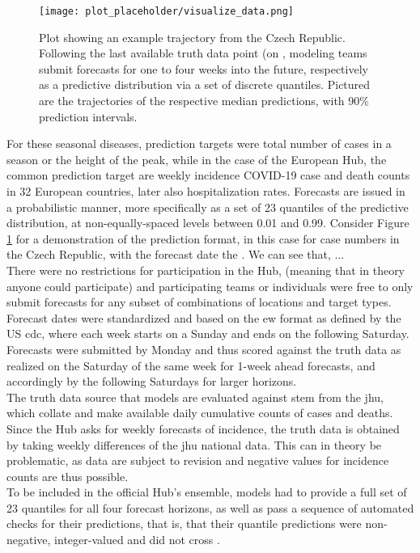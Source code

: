 \begin{figure}
\texttt{[image: plot\_placeholder/visualize\_data.png]}
\caption{ Plot showing an example trajectory from the Czech Republic. Following the last available truth data point (on , modeling teams submit forecasts for one to four weeks into the future, respectively as a predictive distribution via a set of discrete quantiles. Pictured are the trajectories of the respective median predictions, with 90\% prediction intervals.}
\label{fig:czech_predictions}
\end{figure}
For these seasonal diseases, prediction targets were total number of cases in a season or the height of the peak, while in the case of the European Hub, the common prediction target are weekly incidence COVID-19 case and death counts in 32 European countries, later also hospitalization rates. Forecasts are issued in a probabilistic manner, more specifically as a set of 23 quantiles of the predictive distribution, at non-equally-spaced levels between 0.01 and 0.99. Consider Figure \ref{fig:czech_predictions} for a demonstration of the prediction format, in this case for case numbers in the Czech Republic, with the forecast date the . We can see that, ...\\ 
There were no restrictions for participation in the Hub, (meaning that in theory anyone could participate) and participating teams or individuals were free to only submit forecasts for any subset of combinations of locations and target types. Forecast dates were standardized and based on the \ac{ew} format as defined by the US \ac{cdc}, where each week starts on a Sunday and ends on the following Saturday. Forecasts were submitted by Monday and thus scored against the truth data as realized on the Saturday of the same week for 1-week ahead forecasts, and accordingly by the following Saturdays for larger horizons.\\ 
The truth data source that models are evaluated against stem from the \ac{jhu}, which collate and make available daily cumulative counts of cases and deaths. Since the Hub asks for weekly forecasts of incidence, the truth data is obtained by taking weekly differences of the \ac{jhu} national data. This can in theory be problematic, as data are subject to revision and negative values for incidence counts are thus possible.\\
To be included in the official Hub's ensemble, models had to provide a full set of 23 quantiles for all four forecast horizons, as well as pass a sequence of automated checks for their predictions, that is, that their quantile predictions were non-negative, integer-valued and did not cross \citep{sherratt_european_2022}.\\
